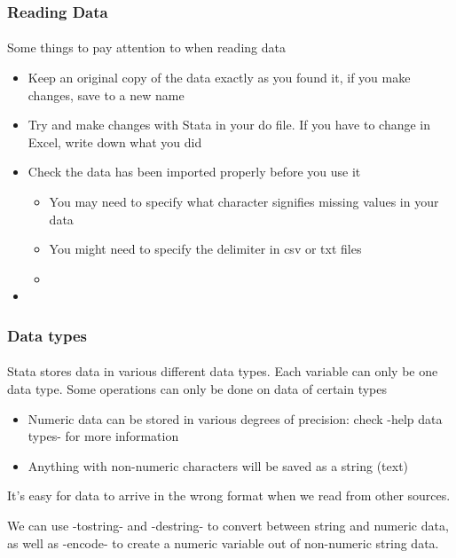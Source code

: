 \documentclass{beamer}
\begin{document}
\begin{frame}
  \frametitle{Reading Data}
  \framesubtitle{}
Some things to pay attention to when reading data
  \begin{itemize}
    \item Keep an original copy of the data exactly as you found it, if you make changes, save to a new name
    \item Try and make changes with Stata in your do file. If you have to change in Excel, write down what you did
    \item Check the data has been imported properly before you use it
	\begin{itemize}
	    \item You may need to specify what character signifies missing values in your data 
	    \item You might need to specify the delimiter in csv or txt files
	    \item 
	\end{itemize}
    \item 

  \end{itemize}
\end{frame}

\begin{frame}
  \frametitle{Data types}
  \framesubtitle{}
Stata stores data in various different data types. Each variable can only be one data type. Some operations can only be done on data of certain types
  \begin{itemize}
    \item Numeric data can be stored in various degrees of precision: check -help data types- for more information
    \item Anything with non-numeric characters will be saved as a string (text)
  \end{itemize}

It's easy for data to arrive in the wrong format when we read from other sources.


We can use -tostring- and -destring- to convert between string and numeric data, as well as -encode- to create a numeric variable out of non-numeric string data.
\end{frame}
\end{document}

